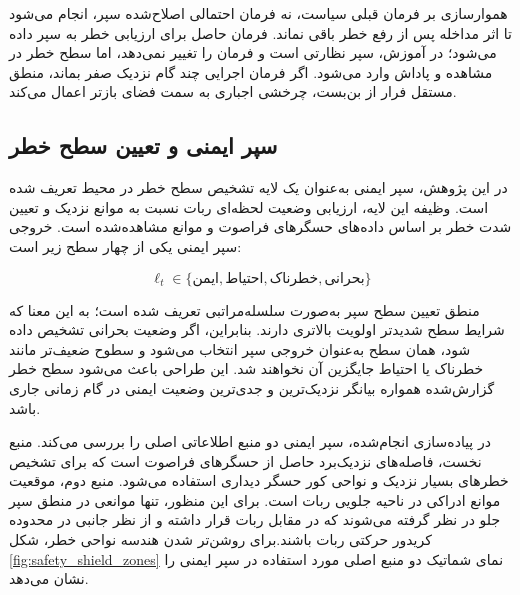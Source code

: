 هموارسازی بر فرمان قبلی سیاست، نه فرمان احتمالی اصلاح‌شده سپر، انجام می‌شود تا اثر مداخله پس از رفع خطر باقی نماند. فرمان حاصل برای ارزیابی خطر به سپر داده می‌شود؛ در آموزش، سپر نظارتی است و فرمان را تغییر نمی‌دهد، اما سطح خطر در مشاهده و پاداش وارد می‌شود. اگر فرمان اجرایی چند گام نزدیک صفر بماند، منطق مستقل فرار از بن‌بست، چرخشی اجباری به سمت فضای بازتر اعمال می‌کند.

\subsection{سپر ایمنی و تعیین سطح خطر}
\label{subsec:safety_shield_levels_final}

در این پژوهش، سپر ایمنی به‌عنوان یک لایه تشخیص سطح خطر در محیط تعریف شده است. وظیفه این لایه، ارزیابی وضعیت لحظه‌ای ربات نسبت به موانع نزدیک و تعیین شدت خطر بر اساس داده‌های حسگرهای فراصوت و موانع مشاهده‌شده است. خروجی سپر ایمنی یکی از چهار سطح زیر است:

\begin{equation}
	\ell_t \in 
	\{
	\text{ایمن},
	\text{احتیاط},
	\text{خطرناک},
	\text{بحرانی}
	\}
	\label{eq:shield_levels_final}
\end{equation}

منطق تعیین سطح سپر به‌صورت سلسله‌مراتبی تعریف شده است؛ به این معنا که شرایط سطح شدیدتر اولویت بالاتری دارند. بنابراین، اگر وضعیت بحرانی تشخیص داده شود، همان سطح به‌عنوان خروجی سپر انتخاب می‌شود و سطوح ضعیف‌تر مانند خطرناک یا احتیاط جایگزین آن نخواهند شد. این طراحی باعث می‌شود سطح خطر گزارش‌شده همواره بیانگر نزدیک‌ترین و جدی‌ترین وضعیت ایمنی در گام زمانی جاری باشد.

در پیاده‌سازی انجام‌شده، سپر ایمنی دو منبع اطلاعاتی اصلی را بررسی می‌کند. منبع نخست، فاصله‌های نزدیک‌برد حاصل از حسگرهای فراصوت است که برای تشخیص خطرهای بسیار نزدیک و نواحی کور حسگر دیداری استفاده می‌شود. منبع دوم، موقعیت موانع ادراکی در ناحیه جلویی ربات است. برای این منظور، تنها موانعی در منطق سپر جلو در نظر گرفته می‌شوند که در مقابل ربات قرار داشته و از نظر جانبی در محدوده کریدور حرکتی ربات باشند.برای روشن‌تر شدن هندسه نواحی خطر، شکل \ref{fig:safety_shield_zones} نمای شماتیک دو منبع اصلی مورد استفاده در سپر ایمنی را نشان می‌دهد.

